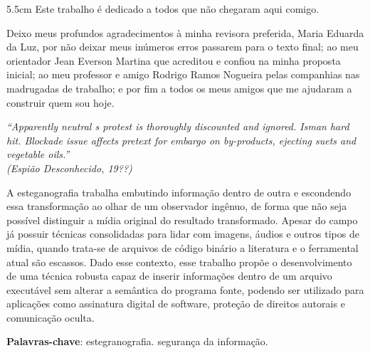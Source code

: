 \begin{dedicatoria}
	\vspace*{\fill}
	\noindent
	\begin{adjustwidth*}{}{5.5cm}     
		Este trabalho é dedicado a todos que não chegaram aqui comigo.
	\end{adjustwidth*}
\end{dedicatoria}

\begin{agradecimentos}
	Deixo meus profundos agradecimentos à minha revisora preferida, Maria Eduarda da Luz, por não deixar meus inúmeros erros passarem para o texto final; ao meu orientador Jean Everson Martina que acreditou e confiou na minha proposta inicial; ao meu professor e amigo Rodrigo Ramos Nogueira pelas companhias nas madrugadas de trabalho; e por fim a todos os meus amigos que me ajudaram a construir quem sou hoje. 
\end{agradecimentos}

\begin{epigrafe}
	\vspace*{\fill}
	\begin{flushright}
		\textit{``Apparently neutral s protest is thoroughly discounted and ignored. Isman hard hit. Blockade issue affects pretext for embargo on by-products, ejecting suets and vegetable oils.''\\
			(Espião Desconhecido, 19??)}
	\end{flushright}
\end{epigrafe}


\setlength{\absparsep}{18pt} %
\begin{resumo}
	\SingleSpacing
	A esteganografia trabalha embutindo informação dentro de outra e escondendo essa transformação ao olhar de um observador ingênuo, de forma que não seja possível distinguir a mídia original do resultado transformado. Apesar do campo já possuir técnicas consolidadas para lidar com imagens, áudios e outros tipos de mídia, quando trata-se de arquivos de código binário a literatura e o ferramental atual são escassos. Dado esse contexto, esse trabalho propõe o desenvolvimento de uma técnica robusta capaz de inserir informações dentro de um arquivo executável sem alterar a semântica do programa fonte, podendo ser utilizado para aplicações como assinatura digital de software, proteção de direitos autorais e comunicação oculta.
	
	\textbf{Palavras-chave}: estegranografia. segurança da informação.
\end{resumo}

